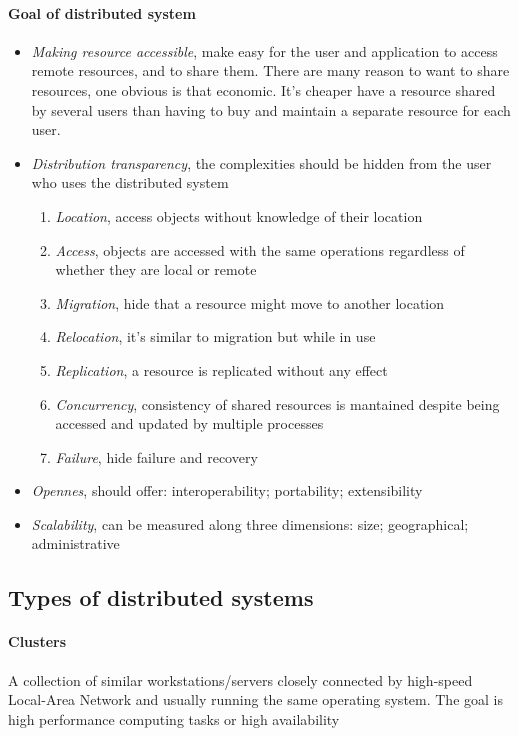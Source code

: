 \paragraph{Goal of distributed system}
\begin{itemize}
    \item \textit{Making resource accessible}, make easy for the user and application to access remote resources, and to share them. There are many reason to want to share resources, one obvious is that economic. It’s cheaper have a resource shared by several users than having to buy and maintain a separate resource for each user.
    \item \textit{Distribution transparency}, the complexities should be hidden from the user who uses the distributed system
    \begin{enumerate}
        \item \textit{Location}, access objects without knowledge of their location
        \item \textit{Access}, objects are accessed with the same operations regardless of whether they are local or remote
        \item \textit{Migration}, hide that a resource might move to another location
        \item \textit{Relocation}, it's similar to migration but while in use
        \item \textit{Replication}, a resource is replicated without any effect
        \item \textit{Concurrency}, consistency of shared resources is mantained despite being accessed and updated by multiple processes
        \item \textit{Failure}, hide failure and recovery 
    \end{enumerate}
    \item \textit{Opennes}, should offer: interoperability; portability; extensibility
    \item \textit{Scalability}, can be measured along three dimensions: size; geographical; administrative
\end{itemize}

\subsection{Types of distributed systems}

\paragraph{Clusters}
 A collection of similar workstations/servers closely connected by high-speed Local-Area Network and usually running the same operating system. The goal is high performance computing tasks or high availability

